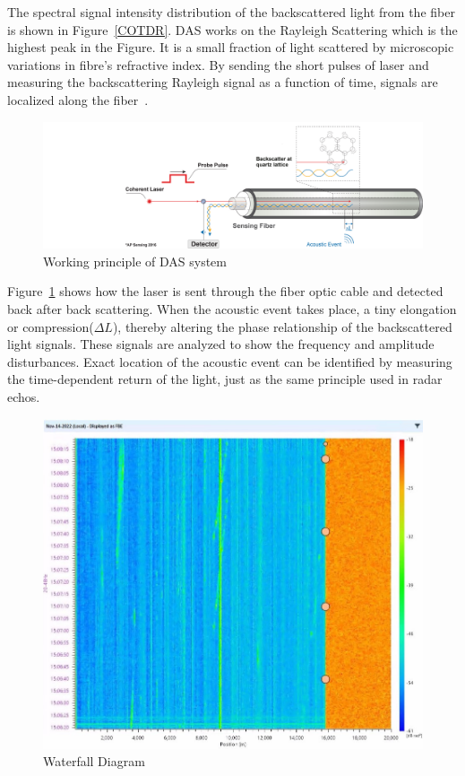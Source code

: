The spectral signal intensity distribution of the backscattered light from the fiber is shown in Figure~\ref{COTDR}. DAS works on the Rayleigh Scattering which is the highest peak in the Figure. It is a small fraction of light scattered by microscopic variations in fibre's refractive index. By sending the short pulses of laser and measuring the backscattering Rayleigh signal as a function of time, signals are localized along the fiber~\cite{masoudi}.  

\begin{figure}[h]
    \centering
    \includegraphics[width=0.8\linewidth]{Bilder/jpg/DAS_Acoustic_Event.jpg}
    \caption{Working principle of DAS system~\cite{DAS_Manual}}
    \label{DAS_working}
\end{figure}

Figure~\ref{DAS_working} shows how the laser is sent through the fiber optic cable and detected back after back scattering. When the acoustic event takes place, a tiny elongation or compression($\Delta L$), thereby altering the phase relationship of the backscattered light signals. These signals are analyzed to show the frequency and amplitude disturbances. Exact location of the acoustic event can be identified by measuring the time-dependent return of the light, just as the same principle used in radar echos. 

\begin{figure}[h]
  \centering
  \includegraphics[width=0.7\linewidth]{Bilder/jpg/DAS Waterfall.jpg}
  \caption{Waterfall Diagram~\cite{Waterfall}}
  \label{DAS_waterfall}
\end{figure}

